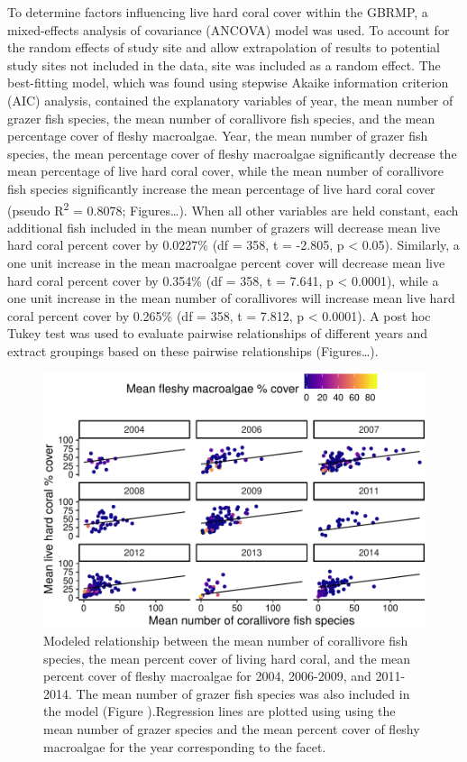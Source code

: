 \documentclass[12pt,]{article}
\begin{document}
To determine factors influencing live hard coral cover within the GBRMP,
a mixed-effects analysis of covariance (ANCOVA) model was used. To
account for the random effects of study site and allow extrapolation of
results to potential study sites not included in the data, site was
included as a random effect. The best-fitting model, which was found
using stepwise Akaike information criterion (AIC) analysis, contained
the explanatory variables of year, the mean number of grazer fish
species, the mean number of corallivore fish species, and the mean
percentage cover of fleshy macroalgae. Year, the mean number of grazer
fish species, the mean percentage cover of fleshy macroalgae
significantly decrease the mean percentage of live hard coral cover,
while the mean number of corallivore fish species significantly increase
the mean percentage of live hard coral cover (pseudo
R\textsuperscript{2} = 0.8078; Figures\ldots{}). When all other
variables are held constant, each additional fish included in the mean
number of grazers will decrease mean live hard coral percent cover by
0.0227\% (df = 358, t = -2.805, p \textless{} 0.05). Similarly, a one
unit increase in the mean macroalgae percent cover will decrease mean
live hard coral percent cover by 0.354\% (df = 358, t = 7.641, p
\textless{} 0.0001), while a one unit increase in the mean number of
corallivores will increase mean live hard coral percent cover by 0.265\%
(df = 358, t = 7.812, p \textless{} 0.0001). A post hoc Tukey test was
used to evaluate pairwise relationships of different years and extract
groupings based on these pairwise relationships (Figures\ldots{}).

\begin{figure}

\includegraphics{Mullaney_ENV872_Project_files/figure-latex/Coral Percent Cover Plot (Corallivores)-1} \hfill{}

\caption{Modeled relationship between the mean number of corallivore fish species, the mean percent cover of living hard coral, and the mean percent cover of fleshy macroalgae for 2004, 2006-2009, and 2011-2014. The mean number of grazer fish species was also included in the model (Figure ).Regression lines are plotted using using the mean number of grazer species and the mean percent cover of fleshy macroalgae for the year corresponding to the facet.}\label{fig:Coral Percent Cover Plot (Corallivores)}
\end{figure}
\end{document}
